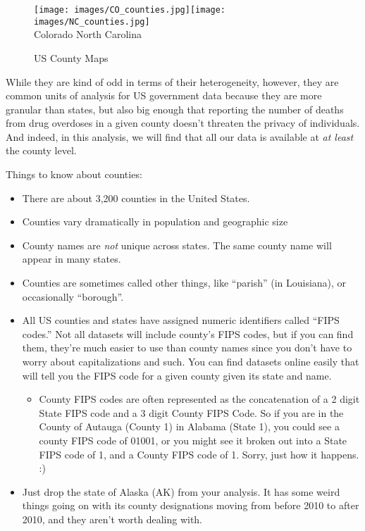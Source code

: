 \documentclass[12pt]{article}
\begin{document}
\begin{figure}[h!]
  \centering
  \caption{US County Maps}\label{counties}
  \texttt{[image: images/CO\_counties.jpg]}\texttt{[image: images/NC\_counties.jpg]}\\
  \scriptsize{Colorado \hspace*{5cm} North Carolina}
\end{figure}

While they are kind of odd in terms of their heterogeneity, however, they are common units of analysis for US government data because they are more granular than states, but also big enough that reporting the number of deaths from drug overdoses in a given county doesn't threaten the privacy of individuals. And indeed, in this analysis, we will find that all our data is available at \emph{at least} the county level.

Things to know about counties:

\begin{itemize}
  \item There are about 3,200 counties in the United States.
  \item Counties vary dramatically in population and geographic size
  \item County names are \emph{not} unique across states. The same county name will appear in many states.
  \item Counties are sometimes called other things, like ``parish'' (in Louisiana), or occasionally ``borough''.
  \item All US counties and states have assigned numeric identifiers called ``FIPS codes.'' Not all datasets will include county's FIPS codes, but if you can find them, they're much easier to use than county names since you don't have to worry about capitalizations and such. You can find datasets online easily that will tell you the FIPS code for a given county given its state and name.
  \begin{itemize}
    \item County FIPS codes are often represented as the concatenation of a 2 digit State FIPS code and a 3 digit County FIPS Code. So if you are in the County of Autauga (County 1) in Alabama (State 1), you could see a county FIPS code of 01001, or you might see it broken out into a State FIPS code of 1, and a County FIPS code of 1. Sorry, just how it happens. :)
  \end{itemize}
  \item Just drop the state of Alaska (AK) from your analysis. It has some weird things going on with its county designations moving from before 2010 to after 2010, and they aren't worth dealing with.
\end{itemize}
\end{document}
